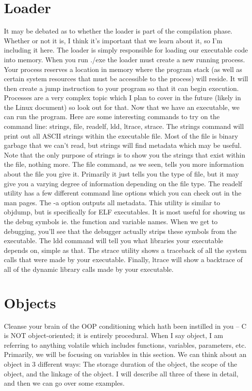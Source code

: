 \documentclass{article}
\begin{document}
\section{Loader}

It may be debated as to whether the loader is part of the compilation phase. Whether or not it is, I think
it’s important that we learn about it, so I’m including it here. The loader is simply responsible for loading
our executable code into memory. When you run ./exe the loader must create a new running process. Your
process reserves a location in memory where the program stack (as well as certain system resources that must
be accessible to the process) will reside. It will then create a jump instruction to your program so that it
can begin execution. Processes are a very complex topic which I plan to cover in the future (likely in the
Linux document) so look out for that. Now that we have an executable, we can run the program. Here are some
interesting commands to try on the command line: strings, file, readelf, ldd, ltrace, strace. The strings
command will print out all ASCII strings within the executable file. Most of the file is binary garbage that
we can’t read, but strings will find metadata which may be useful. Note that the only purpose of strings is
to show you the strings that exist within the file, nothing more. The file command, as we seen, tells you
more information about the file you give it. Primarily it just tells you the type of file, but it may give
you a varying degree of information depending on the file type. The readelf utility has a few different
command line options which you can check out in the man pages. The -a option outputs all metadata. This
utility is similar to objdump, but is specifically for ELF executables. It is most useful for showing us the
debug symbols ie. the function and variable names. When we get to debugging, you’ll see that the debugger
actually strips these symbols from the executable. The ldd command will tell you what libraries your
executable depends on, simple as that. The strace utility shows a traceback of all the system calls that were
made by your executable. Finally, ltrace will show a backtrace of all of the dynamic library calls made by
your executable.

\section{Objects}

Cleanse your brain of the OOP conditioning which hath been instilled in you – C is NOT object-oriented; it is
entirely procedural. When I say object, I am referring to anything volatile which includes functions,
variables, parameters, etc. Primarily, we will be focusing on variables in this section. We can think about
an object in 3 different ways: The storage duration of the object, the scope of the object, and the linkage
of the object. I will describe all three of these in detail, and then we can go over some examples.
\end{document}
